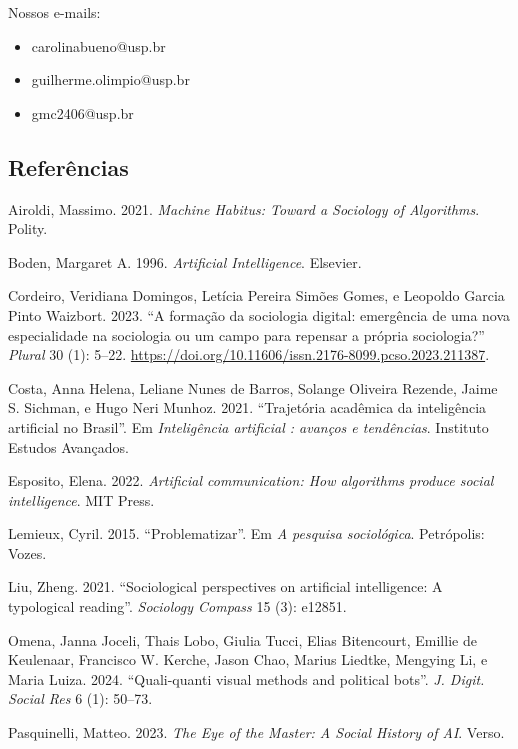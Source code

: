 \documentclass[
  brazilian,
  letterpaper,
  DIV=11,
  numbers=noendperiod]{scrartcl}
\newlength{\cslhangindent}
\newenvironment{CSLReferences}[2] %
 {\begin{list}{}{%
  \setlength{\itemindent}{0pt}
  \setlength{\leftmargin}{0pt}
  \setlength{\parsep}{0pt}
  \ifodd #1
   \setlength{\leftmargin}{\cslhangindent}
   \setlength{\itemindent}{-1\cslhangindent}
  \fi
  \setlength{\itemsep}{#2\baselineskip}}}
 {\end{list}}
\providecommand{\tightlist}{%
  \setlength{\itemsep}{0pt}\setlength{\parskip}{0pt}}
\begin{document}
Nossos e-mails:

\begin{itemize}
\tightlist
\item
  carolinabueno@usp.br
\item
  guilherme.olimpio@usp.br
\item
  gmc2406@usp.br
\end{itemize}

\subsection{Referências}\label{referuxeancias}

\label{refs.bib}

\label{refs}
\begin{CSLReferences}{1}{0}
Airoldi, Massimo. 2021. \emph{Machine Habitus: Toward a Sociology of
Algorithms}. Polity.

Boden, Margaret A. 1996. \emph{Artificial Intelligence}. Elsevier.

Cordeiro, Veridiana Domingos, Letícia Pereira Simões Gomes, e Leopoldo
Garcia Pinto Waizbort. 2023. {``A formação da sociologia digital:
emergência de uma nova especialidade na sociologia ou um campo para
repensar a própria sociologia?''} \emph{Plural} 30 (1): 5--22.
\url{https://doi.org/10.11606/issn.2176-8099.pcso.2023.211387}.

Costa, Anna Helena, Leliane Nunes de Barros, Solange Oliveira Rezende,
Jaime S. Sichman, e Hugo Neri Munhoz. 2021. {``Trajetória acadêmica da
inteligência artificial no Brasil''}. Em \emph{Inteligência artificial :
avanços e tendências}. Instituto Estudos Avançados.

Esposito, Elena. 2022. \emph{Artificial communication: How algorithms
produce social intelligence}. MIT Press.

Lemieux, Cyril. 2015. {``Problematizar''}. Em \emph{A pesquisa
sociológica}. Petrópolis: Vozes.

Liu, Zheng. 2021. {``Sociological perspectives on artificial
intelligence: A typological reading''}. \emph{Sociology Compass} 15 (3):
e12851.

Omena, Janna Joceli, Thais Lobo, Giulia Tucci, Elias Bitencourt, Emillie
de Keulenaar, Francisco W. Kerche, Jason Chao, Marius Liedtke, Mengying
Li, e Maria Luiza. 2024. {``Quali-quanti visual methods and political
bots''}. \emph{J. Digit. Social Res} 6 (1): 50--73.

Pasquinelli, Matteo. 2023. \emph{The Eye of the Master: A Social History
of AI}. Verso.

\end{CSLReferences}
\end{document}
